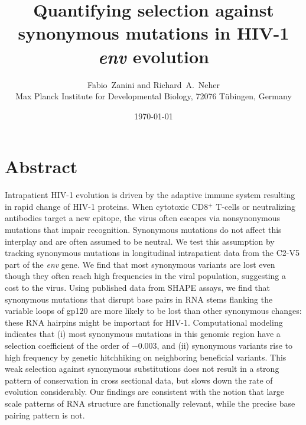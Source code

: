 \documentclass[11pt]{article}
\newcommand{\env}{\textit{env}}
\newcommand{\shankaregion}{C2-V5}
\newcommand{\Author}{Fabio~Zanini and Richard~A.~Neher}
\newcommand{\Title}{Quantifying selection against synonymous mutations in HIV-1 \env{} evolution}
\newcommand{\Affiliation}{Max Planck Institute for Developmental Biology, 72076 T\"ubingen, Germany}
\begin{document}
\title{\Title}
\author{\Author\\ \Affiliation}
\date{\today}
\maketitle

\newpage
\section*{Abstract}
\noindent
Intrapatient HIV-1 evolution is driven by the adaptive immune system
resulting in rapid change of HIV-1 proteins. When cytotoxic CD8${}^+$ T-cells
or neutralizing antibodies target a new epitope, the virus often escapes via
nonsynonymous mutations that impair recognition. Synonymous mutations do not
affect this interplay and are often assumed to be neutral. We test this
assumption by tracking  synonymous mutations in 
longitudinal intrapatient data from the \shankaregion{} part of the \env{}
gene. We find that most synonymous variants are lost even though
they often reach high frequencies in the viral population, suggesting a
cost to the virus. Using published data
from SHAPE assays, we find that synonymous mutations that disrupt base pairs
in RNA stems flanking the variable loops of gp120 are more likely to be lost than other
synonymous changes: these RNA hairpins might be important for HIV-1.
Computational modeling indicates that (i) most synonymous mutations in this
genomic region have a selection coefficient of the order of $-0.003$, and
(ii) synonymous variants rise to high frequency by genetic hitchhiking on neighboring beneficial
variants. This weak selection against synonymous substitutions does not
result in a strong pattern of conservation in cross sectional data, but
slows down the rate of evolution considerably. Our findings are consistent with the
notion that large scale patterns of RNA structure are functionally
relevant, while the precise base pairing pattern is not.
\end{document}
